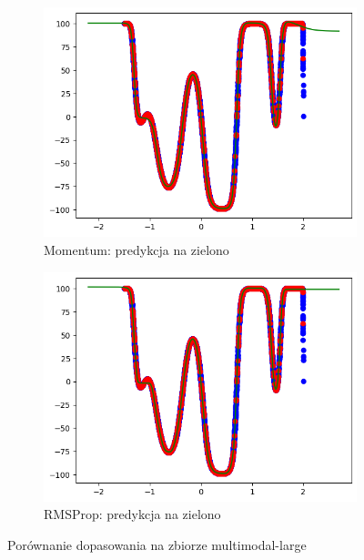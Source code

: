 \documentclass{article}
\begin{document}
\begin{figure}[H]
    \centering
    \begin{subfigure}[b]{0.48\textwidth}
        \centering
        \includegraphics[width=\textwidth]{img/nn3/multimodal-large_momentum_fit.png}
        \caption{Momentum: predykcja na zielono}
    \end{subfigure}
    \hfill
    \begin{subfigure}[b]{0.48\textwidth}
        \centering
        \includegraphics[width=\textwidth]{img/nn3/multimodal-large_rms_fit.png}
        \caption{RMSProp: predykcja na zielono}
    \end{subfigure}
    \caption{Porównanie dopasowania na zbiorze multimodal-large}
\end{figure}
\end{document}
